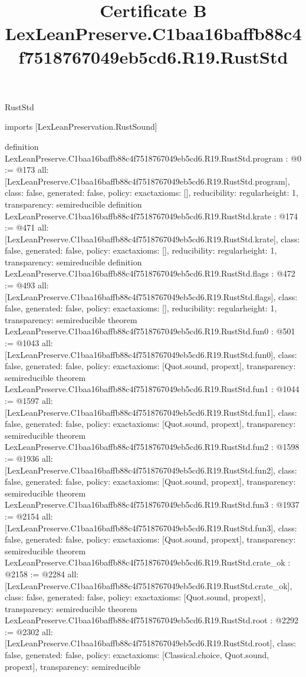 \begin{lexlean}{RustStd}
\title{Certificate B LexLeanPreserve.C1baa16baffb88c4f7518767049eb5cd6.R19.RustStd}
\begin{coremodule}
imports [LexLeanPreservation.RustSound]

definition LexLeanPreserve.C1baa16baffb88c4f7518767049eb5cd6.R19.RustStd.program : @0 := @173 {
  all: [LexLeanPreserve.C1baa16baffb88c4f7518767049eb5cd6.R19.RustStd.program],
  class: false,
  generated: false,
  policy: exact{axioms: []},
  reducibility: regular{height: 1},
  transparency: semireducible
}
definition LexLeanPreserve.C1baa16baffb88c4f7518767049eb5cd6.R19.RustStd.krate : @174 := @471 {
  all: [LexLeanPreserve.C1baa16baffb88c4f7518767049eb5cd6.R19.RustStd.krate],
  class: false,
  generated: false,
  policy: exact{axioms: []},
  reducibility: regular{height: 1},
  transparency: semireducible
}
definition LexLeanPreserve.C1baa16baffb88c4f7518767049eb5cd6.R19.RustStd.flags : @472 := @493 {
  all: [LexLeanPreserve.C1baa16baffb88c4f7518767049eb5cd6.R19.RustStd.flags],
  class: false,
  generated: false,
  policy: exact{axioms: []},
  reducibility: regular{height: 1},
  transparency: semireducible
}
theorem LexLeanPreserve.C1baa16baffb88c4f7518767049eb5cd6.R19.RustStd.fun0 : @501 := @1043 {
  all: [LexLeanPreserve.C1baa16baffb88c4f7518767049eb5cd6.R19.RustStd.fun0],
  class: false,
  generated: false,
  policy: exact{axioms: [Quot.sound, propext]},
  transparency: semireducible
}
theorem LexLeanPreserve.C1baa16baffb88c4f7518767049eb5cd6.R19.RustStd.fun1 : @1044 := @1597 {
  all: [LexLeanPreserve.C1baa16baffb88c4f7518767049eb5cd6.R19.RustStd.fun1],
  class: false,
  generated: false,
  policy: exact{axioms: [Quot.sound, propext]},
  transparency: semireducible
}
theorem LexLeanPreserve.C1baa16baffb88c4f7518767049eb5cd6.R19.RustStd.fun2 : @1598 := @1936 {
  all: [LexLeanPreserve.C1baa16baffb88c4f7518767049eb5cd6.R19.RustStd.fun2],
  class: false,
  generated: false,
  policy: exact{axioms: [Quot.sound, propext]},
  transparency: semireducible
}
theorem LexLeanPreserve.C1baa16baffb88c4f7518767049eb5cd6.R19.RustStd.fun3 : @1937 := @2154 {
  all: [LexLeanPreserve.C1baa16baffb88c4f7518767049eb5cd6.R19.RustStd.fun3],
  class: false,
  generated: false,
  policy: exact{axioms: [Quot.sound, propext]},
  transparency: semireducible
}
theorem LexLeanPreserve.C1baa16baffb88c4f7518767049eb5cd6.R19.RustStd.crate_ok : @2158 := @2284 {
  all: [LexLeanPreserve.C1baa16baffb88c4f7518767049eb5cd6.R19.RustStd.crate_ok],
  class: false,
  generated: false,
  policy: exact{axioms: [Quot.sound, propext]},
  transparency: semireducible
}
theorem LexLeanPreserve.C1baa16baffb88c4f7518767049eb5cd6.R19.RustStd.root : @2292 := @2302 {
  all: [LexLeanPreserve.C1baa16baffb88c4f7518767049eb5cd6.R19.RustStd.root],
  class: false,
  generated: false,
  policy: exact{axioms: [Classical.choice, Quot.sound, propext]},
  transparency: semireducible
}


\end{coremodule}
\end{lexlean}
